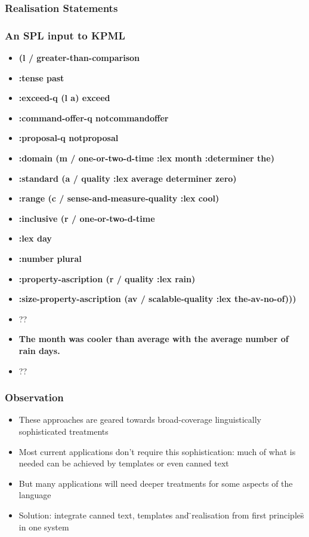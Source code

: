 \documentclass[compress,color=usenames]{beamer}
\begin{document}
\begin{frame}
\frametitle{
Realisation Statements}

\label{f47}
 
\end{frame}

\begin{frame}
\frametitle{
An SPL input to KPML}

\label{f49}
\begin{itemize}
\item {{\textbf{(l / greater-than-comparison}}}
\item {{\textbf{  :tense past}}}
\item {{\textbf{  :exceed-q (l  a) exceed}}}
\item {{\textbf{  :command-offer-q notcommandoffer}}}
\item {{\textbf{  :proposal-q notproposal}}}
\item {{\textbf{  :domain (m / one-or-two-d-time :lex month :determiner the)}}}
\item {{\textbf{  :standard (a / quality :lex average determiner zero)}}}
\item {{\textbf{  :range (c / sense-and-measure-quality :lex cool)}}}
\item {{\textbf{  :inclusive (r / one-or-two-d-time}}}
\item {{\textbf{    :lex day}}}
\item {{\textbf{    :number plural}}}
\item {{\textbf{    :property-ascription (r / quality :lex rain)}}}
\item {{\textbf{    :size-property-ascription 
                         (av / scalable-quality :lex the-av-no-of)))}}}
\item {{\textbf{}}}??
\item {{\textbf{The month was cooler than average with the average number of rain days. }}}
\item {{\textbf{}}}??
\end{itemize}
 
\end{frame}

\begin{frame}
\frametitle{
Observation}

\label{f51}
\begin{itemize}
\item {{These approaches are geared towards broad-coverage linguistically sophisticated treatments}}
\item {{Most current applications don't require this sophistication:  much of what is needed can be achieved by templates or even canned text}}
\item {{But many applications will need deeper treatments for some aspects of the language}}
\item {{Solution:  integrate canned text, templates and \"{}realisation from first principles\"{} in one system}}
\end{itemize}
 
\end{frame}
\end{document}
